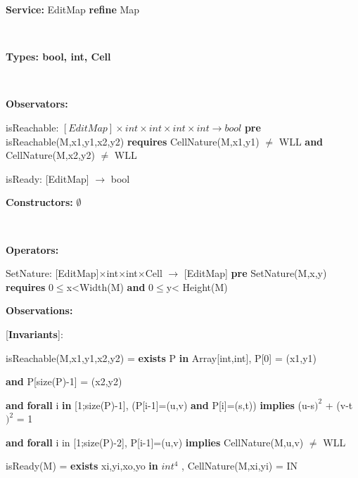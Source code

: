 \documentclass[11pt]{article}
\begin{document}
\vspace*{0.5cm}
\begin{huge}
\textbf{Service:}	EditMap \textbf{refine} Map
\end{huge}\\

\begin{large}
\textbf{Types:	bool, int, Cell} 
\end{large}\\
 
\begin{large}
\textbf{Observators:} 
\end{large}

isReachable: $[EditMap] \times int \times int \times int \times int \rightarrow bool$
\textbf{pre} isReachable(M,x1,y1,x2,y2) \textbf{requires} CellNature(M,x1,y1) $\neq$ WLL \textbf{and} CellNature(M,x2,y2) $\neq$ WLL

isReady: [EditMap] $\rightarrow$ bool\\

\begin{large}
\textbf{Constructors:}  $\emptyset$
\end{large}\\

\begin{large}
\textbf{Operators:}
\end{large}

SetNature: [EditMap]$\times$int$\times$int$\times$Cell $\rightarrow$ [EditMap] \textbf{pre} SetNature(M,x,y) \textbf{requires} 0$\leq$x<Width(M) \textbf{and} 0$\leq$y< Height(M)\\

\begin{large}
\textbf{Observations:}
\end{large}

[\textbf{Invariants}]:

isReachable(M,x1,y1,x2,y2) = \textbf{exists} P \textbf{in} Array[int,int], P[0] = (x1,y1)

\textbf{and} P[size(P)-1] = (x2,y2)

\textbf{and} \textbf{forall} i \textbf{in} [1;size(P)-1], (P[i-1]=(u,v) \textbf{and} P[i]=(s,t)) \textbf{implies} (u-s$ )^2$ + (v-t$)^2$ = 1

\textbf{and} \textbf{forall} i in [1;size(P)-2], P[i-1]=(u,v) \textbf{implies} CellNature(M,u,v) $\neq$ WLL

isReady(M) = \textbf{exists} xi,yi,xo,yo \textbf{in} $int^4$ ,
CellNature(M,xi,yi) = IN 
\end{document}

